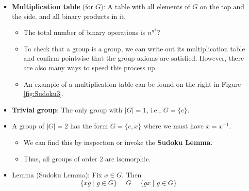 \documentclass[../notes.tex]{subfiles}
\begin{document}
\begin{itemize}
    \begin{proof}
        We have that
        \begin{align*}
            x*y &= x*z\\
            x^{-1}*(x*y) &= x^{-1}*(x*z)\tag*{Inverses exist}\\
            (x^{-1}*x)*y &= (x^{-1}*x)*z\tag*{Associativity}\\
            e*y &= e*z\\
            y &= z
        \end{align*}
        as desired.\par
        The proof of the second statement is symmetric.
    \end{proof}
    \begin{itemize}
        \item This will be Calegari's only proof from the axioms directly.
    \end{itemize}
    \item \textbf{Multiplication table} (for $G$): A table with all elements of $G$ on the top and the side, and all binary products in it.
    \begin{itemize}
        \item The total number of binary operations is $n^{n^2}$?
        \item To check that a group is a group, we can write out its multiplication table and confirm pointwise that the group axioms are satisfied. However, there are also many ways to speed this process up.
        \item An example of a multiplication table can be found on the right in Figure \ref{fig:Sudoku3}.
    \end{itemize}
    \item \textbf{Trivial group}: The only group with $|G|=1$, i.e., $G=\{e\}$.
    \item A group of $|G|=2$ has the form $G=\{e,x\}$ where we must have $x=x^{-1}$.
    \begin{itemize}
        \item We can find this by inspection or invoke the \textbf{Sudoku Lemma}.
        \item Thus, all groups of order 2 are isomorphic.
    \end{itemize}
    \item Lemma (Sudoku Lemma): Fix $x\in G$. Then
    \begin{equation*}
        \{xg\mid g\in G\} = G
        = \{gx\mid g\in G\}
    \end{equation*}

\end{itemize}
\end{document}
